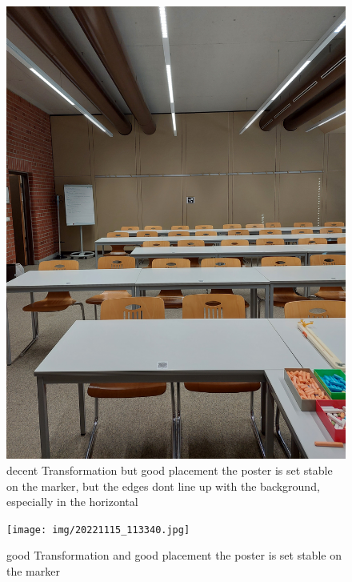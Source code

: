 \documentclass[a4paper,twocolumn]{article}
\begin{document}
\begin{figure}[h!]
\centering
\includegraphics[width=0.9\columnwidth]{img/20221115_113328.jpg} %
\caption{decent Transformation but good placement the poster is set stable on the marker, but the edges dont line up with the background, especially in the horizontal}
\label{fig:20221115_113328.jpg}
\end{figure}

\begin{figure}[h!]
\centering
\texttt{[image: img/20221115\_113340.jpg]} %
\caption{good Transformation and good placement the poster is set stable on the marker}
\label{fig:20221115_113340.jpg}
\end{figure}
\end{document}
